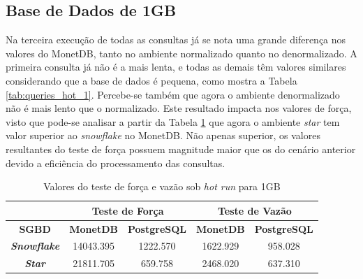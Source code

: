 \subsection{Base de Dados de 1GB}

Na terceira execução de todas as consultas já se nota uma grande diferença nos valores do MonetDB, tanto no ambiente normalizado quanto no denormalizado. A primeira consulta já não é a mais lenta, e todas as demais têm valores similares considerando que a base de dados é pequena, como mostra a Tabela \ref{tab:queries_hot_1}. Percebe-se também que agora o ambiente denormalizado não é mais lento que o normalizado. Este resultado impacta nos valores de força, visto que pode-se analisar a partir da Tabela \ref{tab:forca_vazao_hot_1} que agora o ambiente \textit{star} tem valor superior ao \textit{snowflake} no MonetDB. Não apenas superior, os valores resultantes do teste de força possuem magnitude maior que os do cenário anterior devido a eficiência do processamento das consultas.


\begin{table}[htpb]
        \centering
        \caption{Valores do teste de força e vazão sob \textit{hot run} para 1GB}
        \label{tab:forca_vazao_hot_1}
        \begin{tabular}{|c|c|c|c|c|} 
                \cline{2-5}
                \multicolumn{1}{c|}{}         & \multicolumn{2}{c|}{\textbf{Teste de Força} } & \multicolumn{2}{c|}{\textbf{Teste de Vazão} }  \\ 
                \hline
                 \textbf{SGBD}                & \textbf{MonetDB}  & \textbf{PostgreSQL}       & \textbf{MonetDB}  & \textbf{PostgreSQL}        \\ 
                \hline
                 \textit{\textbf{Snowflake}}  & 14043.395         & 1222.570                  & 1622.929          & 958.028                    \\ 
                \hline
                 \textit{\textbf{Star}}       & 21811.705         & 659.758                   & 2468.020          & 637.310                    \\
                \hline
                \end{tabular}
                \end{table}

